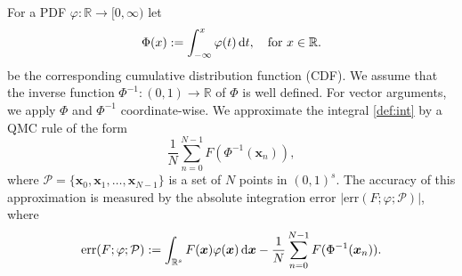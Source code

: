 \documentclass[namedate,webpdf,imanum]{ima-authoring-arxiv}%
\theoremstyle{thmstyletwo}%
\numberwithin{equation}{section}
\newcommand{\rd}{\, {\rm d}}
\newcommand{\bsx}{\boldsymbol{x}}
\newcommand{\RR}{\mathbb{R}}
\begin{document}
For a PDF $\varphi:\RR \rightarrow [0,\infty)$ let
\begin{equation}\label{def:Phi}
\Phi(x) := \int_{-\infty}^x \varphi(t) \rd t, \quad \mbox{for } x \in \mathbb{R}.
\end{equation}
be the corresponding cumulative distribution function (CDF). We assume that the inverse function $\Phi^{-1}:(0,1) \to \mathbb{R}$ of $\Phi$ is well defined. For vector arguments, we apply $\Phi$ and $\Phi^{-1}$ coordinate-wise. We approximate the integral \eqref{def:int} by a QMC rule of the form
\begin{equation}\label{QMC:rule}
\frac{1}{N} \sum_{n=0}^{N-1} F(\Phi^{-1}(\bsx_n)),
\end{equation}
where $\mathcal{P}=\{\bsx_0,\bsx_1,\ldots,\bsx_{N-1}\}$ is a set of $N$ points in $(0,1)^s$. The accuracy of this approximation is measured by the absolute integration error $|\mathrm{err}(F; \varphi; \mathcal{P})|$, where
\begin{equation*}
\mathrm{err}(F; \varphi; \mathcal{P}) := \int_{\mathbb{R}^s} F(\bsx) \varphi(\bsx) \rd \bsx - \frac{1}{N} \sum_{n=0}^{N-1} F(\Phi^{-1}(\bsx_n)).
\end{equation*}
\end{document}
